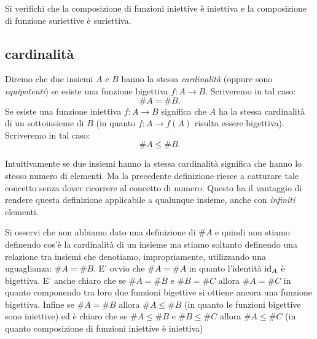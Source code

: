 \begin{exercise}
  Si verifichi che la composizione di funzioni iniettive è iniettiva e la composizione 
  di funzione suriettive è suriettiva.
\end{exercise}

\subsection{cardinalità}

\begin{definition}[cardinalità]
  Diremo che due insiemi $A$ e $B$ hanno la stessa \emph{cardinalità}%
%
  (oppure sono \emph{equipotenti}) 
  se esiste una funzione bigettiva $f\colon A \to B$.
  Scriveremo in tal caso:
  \[
    \# A = \# B.  
  \] 
  Se esiste una funzione iniettiva $f\colon A\to B$ significa che 
  $A$ ha la stessa cardinalità di un sottoinsieme di $B$ (in quanto $f\colon A \to f(A)$
  risulta essere bigettiva). Scriveremo in tal caso:
  \[
    \# A \le \#B.
  \]
\end{definition}

Intuitivamente se due insiemi hanno la stessa cardinalità 
significa che hanno lo stesso numero di elementi.
Ma la precedente definizione riesce a catturare tale concetto senza dover 
ricorrere al concetto di numero. 
Questo ha il vantaggio di rendere questa definizione applicabile 
a qualunque insieme, anche con \emph{infiniti} elementi.

Si osservi che non abbiamo dato una definizione di $\#A$ e quindi non stiamo 
definendo cos'è la cardinalità di un insieme ma stiamo soltanto definendo 
una relazione tra insiemi che 
denotiamo, impropriamente, utilizzando una uguaglianza: $\#A = \#B$.
E' ovvio che $\#A = \#A$ in quanto l'identità $\mathrm{id}_A$ è bigettiva.
E' anche chiaro che se $\#A = \#B$ e $\#B = \#C$ allora $\#A = \#C$ in quanto 
componendo tra loro due funzioni bigettive si ottiene ancora una funzione 
bigettiva. 
Infine se $\#A = \#B$ allora $\#A \le \#B$ (in quanto le funzioni bigettive 
sono iniettive) ed è chiaro che se $\#A \le \#B$ e $\#B \le \#C$ allora 
$\#A\le \#C$ (in quanto composizione di funzioni iniettive è iniettiva)

